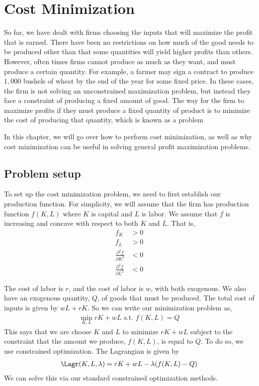 \chapter{Cost Minimization} \label{ch:cost_minimization}
So far, we have dealt with firms choosing the inputs that will maximize the profit that is earned. There have been no restrictions on how much of the good needs to be produced other than that some quantities will yield higher profits than others. However, often times firms cannot produce as much as they want, and must produce a certain quantity. For example, a farmer may sign a contract to produce $1,000$ bushels of wheat by the end of the year for some fixed price. In these cases, the firm is not solving an unconstrained maximization problem, but instead they face a constraint of producing a fixed amount of good. The way for the firm to maximize profits if they must produce a fixed quantity of product is to minimize the cost of producing that quantity, which is known as a  problem

In this chapter, we will go over how to perform cost minimization, as well as why cost minimization can be useful in solving general profit maximization problems. 

\section{Problem setup}
To set up the cost minimization problem, we need to first establish our production function. For simplicity, we will assume that the firm has production function $f(K, L)$ where $K$ is capital and $L$ is labor. We assume that $f$ is increasing and concave with respect to both $K$ and $L$. That is,
\begin{align*}
    f_K &> 0 \\
    f_L &> 0 \\ 
    \frac{\partial^2 f}{\partial K^2} &< 0 \\
    \frac{\partial^2 f}{\partial L^2} &< 0
\end{align*}

The cost of labor is $r$, and the cost of labor is $w$, with both exogenous. We also have an exogenous quantity, $Q$, of goods that must be produced. The total cost of inputs is given by $wL + rK$. So we can write our minimization problem as,
\begin{align*}
    \min_{K, L} rK  + wL \text{ s.t. } f(K, L) = Q
\end{align*}
This says that we are choose $K$ and $L$ to minimize $rK + wL$ subject to the constraint that the amount we produce, $f(K, L)$, is equal to $Q$. To do so, we use constrained optimization. The Lagrangian is given by
\begin{align*}
    \Lagr(K, L, \lambda) = rK + wL - \lambda(f(K, L) - Q)
\end{align*}
We can solve this via our standard constrained optimization methods.

